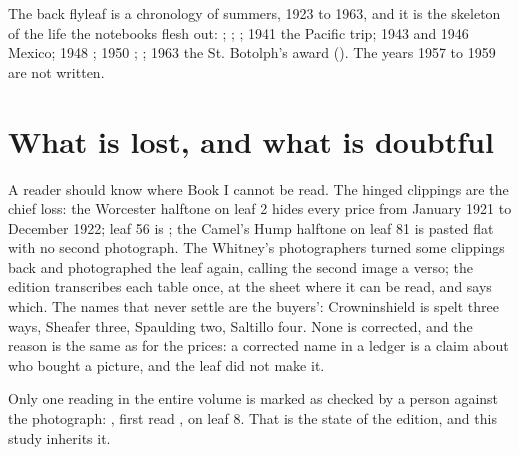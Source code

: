 The back flyleaf is a chronology of summers, 1923 to 1963, and it is the skeleton of the life the notebooks flesh out: ; ; ; 1941 the Pacific trip; 1943 and 1946 Mexico; 1948 ; 1950 ; ; 1963 the St. Botolph's award (). The years 1957 to 1959 are not written.

\section{What is lost, and what is doubtful}

A reader should know where Book I cannot be read. The hinged clippings are the chief loss: the Worcester halftone on leaf 2 hides every price from January 1921 to December 1922; leaf 56 is ; the Camel's Hump halftone on leaf 81 is pasted flat with no second photograph. The Whitney's photographers turned some clippings back and photographed the leaf again, calling the second image a verso; the edition transcribes each table once, at the sheet where it can be read, and says which. The names that never settle are the buyers': Crowninshield is spelt three ways, Sheafer three, Spaulding two, Saltillo four. None is corrected, and the reason is the same as for the prices: a corrected name in a ledger is a claim about who bought a picture, and the leaf did not make it.

\enlargethispage{3\baselineskip}Only one reading in the entire volume is marked as checked by a person against the photograph: , first read , on leaf 8. That is the state of the edition, and this study inherits it.
